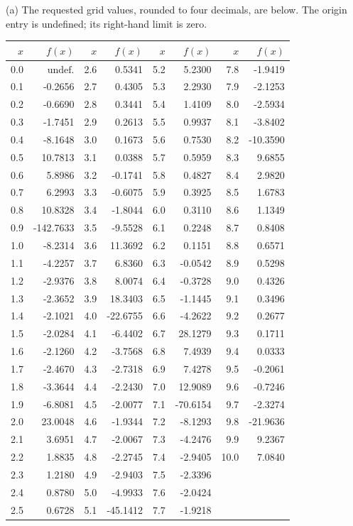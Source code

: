 (a) The requested grid values, rounded to four decimals, are below.
The origin entry is undefined; its right-hand limit is zero.
\begin{center}\small
\begin{tabular}{r r r r r r r r}
\toprule
$x$ & $f(x)$ & $x$ & $f(x)$ & $x$ & $f(x)$ & $x$ & $f(x)$\\
\midrule
0.0 & $\mathrm{undef.}$ & 2.6 & 0.5341 & 5.2 & 5.2300 & 7.8 & -1.9419 \\
0.1 & -0.2656 & 2.7 & 0.4305 & 5.3 & 2.2930 & 7.9 & -2.1253 \\
0.2 & -0.6690 & 2.8 & 0.3441 & 5.4 & 1.4109 & 8.0 & -2.5934 \\
0.3 & -1.7451 & 2.9 & 0.2613 & 5.5 & 0.9937 & 8.1 & -3.8402 \\
0.4 & -8.1648 & 3.0 & 0.1673 & 5.6 & 0.7530 & 8.2 & -10.3590 \\
0.5 & 10.7813 & 3.1 & 0.0388 & 5.7 & 0.5959 & 8.3 & 9.6855 \\
0.6 & 5.8986 & 3.2 & -0.1741 & 5.8 & 0.4827 & 8.4 & 2.9820 \\
0.7 & 6.2993 & 3.3 & -0.6075 & 5.9 & 0.3925 & 8.5 & 1.6783 \\
0.8 & 10.8328 & 3.4 & -1.8044 & 6.0 & 0.3110 & 8.6 & 1.1349 \\
0.9 & -142.7633 & 3.5 & -9.5528 & 6.1 & 0.2248 & 8.7 & 0.8408 \\
1.0 & -8.2314 & 3.6 & 11.3692 & 6.2 & 0.1151 & 8.8 & 0.6571 \\
1.1 & -4.2257 & 3.7 & 6.8360 & 6.3 & -0.0542 & 8.9 & 0.5298 \\
1.2 & -2.9376 & 3.8 & 8.0074 & 6.4 & -0.3728 & 9.0 & 0.4326 \\
1.3 & -2.3652 & 3.9 & 18.3403 & 6.5 & -1.1445 & 9.1 & 0.3496 \\
1.4 & -2.1021 & 4.0 & -22.6755 & 6.6 & -4.2622 & 9.2 & 0.2677 \\
1.5 & -2.0284 & 4.1 & -6.4402 & 6.7 & 28.1279 & 9.3 & 0.1711 \\
1.6 & -2.1260 & 4.2 & -3.7568 & 6.8 & 7.4939 & 9.4 & 0.0333 \\
1.7 & -2.4670 & 4.3 & -2.7318 & 6.9 & 7.4278 & 9.5 & -0.2061 \\
1.8 & -3.3644 & 4.4 & -2.2430 & 7.0 & 12.9089 & 9.6 & -0.7246 \\
1.9 & -6.8081 & 4.5 & -2.0077 & 7.1 & -70.6154 & 9.7 & -2.3274 \\
2.0 & 23.0048 & 4.6 & -1.9344 & 7.2 & -8.1293 & 9.8 & -21.9636 \\
2.1 & 3.6951 & 4.7 & -2.0067 & 7.3 & -4.2476 & 9.9 & 9.2367 \\
2.2 & 1.8835 & 4.8 & -2.2745 & 7.4 & -2.9405 & 10.0 & 7.0840 \\
2.3 & 1.2180 & 4.9 & -2.9403 & 7.5 & -2.3396 &  &  \\
2.4 & 0.8780 & 5.0 & -4.9933 & 7.6 & -2.0424 &  &  \\
2.5 & 0.6728 & 5.1 & -45.1412 & 7.7 & -1.9218 &  &  \\
\bottomrule
\end{tabular}\normalsize
\end{center}
